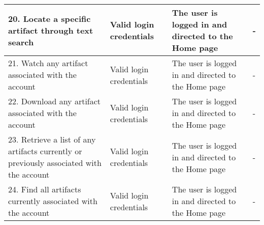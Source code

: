 \begin{tabular}{ | p{2cm} | p{2cm} | p{4cm} | p{4cm} | }
	20. Locate a specific artifact through text search & Valid login credentials & The user is logged in and directed to the Home page & - \\
	\hline
	21. Watch any artifact associated with the account & Valid login credentials & The user is logged in and directed to the Home page & - \\
	\hline
	22. Download any artifact associated with the account & Valid login credentials & The user is logged in and directed to the Home page & - \\
	\hline
	23. Retrieve a list of any artifacts currently or previously associated with the account & Valid login credentials & The user is logged in and directed to the Home page & - \\
	\hline
	24. Find all artifacts currently associated with the account & Valid login credentials & The user is logged in and directed to the Home page & - \\
	\hline
\end{tabular}